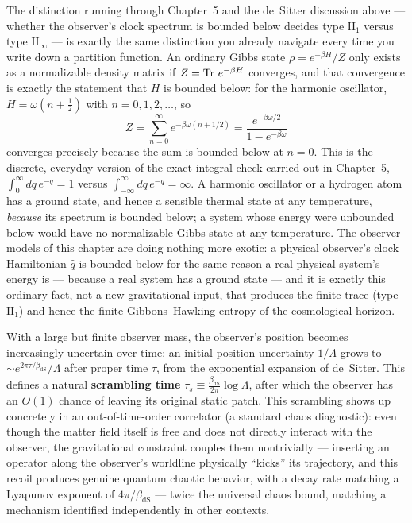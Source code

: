 \begin{physconnect}
The distinction running through Chapter~5 and the de~Sitter discussion above — whether the observer's clock
spectrum is bounded below decides type $\mathrm{II}_1$ versus type $\mathrm{II}_\infty$ — is exactly the same
distinction you already navigate every time you write down a partition function. An ordinary Gibbs state
$\rho=e^{-\beta H}/Z$ only exists as a normalizable density matrix if $Z=\operatorname{Tr}\,e^{-\beta H}$ converges, and
that convergence is exactly the statement that $H$ is bounded below: for the harmonic oscillator,
$H=\omega(n+\tfrac12)$ with $n=0,1,2,\dots$, so
\[
Z=\sum_{n=0}^\infty e^{-\beta\omega(n+1/2)}=\frac{e^{-\beta\omega/2}}{1-e^{-\beta\omega}}
\]
converges precisely because the sum is bounded below at $n=0$. This is the discrete, everyday version of the
exact integral check carried out in Chapter~5, $\int_0^\infty dq\,e^{-q}=1$ versus $\int_{-\infty}^\infty
dq\,e^{-q}=\infty$. A harmonic oscillator or a hydrogen atom has a ground state, and hence a sensible thermal
state at any temperature, \emph{because} its spectrum is bounded below; a system whose energy were unbounded
below would have no normalizable Gibbs state at any temperature. The observer models of this chapter are doing
nothing more exotic: a physical observer's clock Hamiltonian $\hat q$ is bounded below for the same reason a
real physical system's energy is — because a real system has a ground state — and it is exactly this ordinary
fact, not a new gravitational input, that produces the finite trace (type $\mathrm{II}_1$) and hence the
finite Gibbons--Hawking entropy of the cosmological horizon.
\end{physconnect}

With a large but finite observer mass, the observer's position becomes increasingly uncertain over time: an
initial position uncertainty $1/\Lambda$ grows to $\sim e^{2\pi\tau/\beta_{\text{dS}}}/\Lambda$ after proper
time $\tau$, from the exponential expansion of de~Sitter. This defines a natural \textbf{scrambling time}
$\tau_s\equiv\tfrac{\beta_{\text{dS}}}{2\pi}\log\Lambda$, after which the observer has an $O(1)$ chance of
leaving its original static patch. This scrambling shows up concretely in an out-of-time-order correlator (a
standard chaos diagnostic): even though the matter field itself is free and does not directly interact with
the observer, the gravitational constraint couples them nontrivially — inserting an operator along the
observer's worldline physically ``kicks'' its trajectory, and this recoil produces genuine quantum chaotic
behavior, with a decay rate matching a Lyapunov exponent of $4\pi/\beta_{\text{dS}}$ — twice the universal
chaos bound, matching a mechanism identified independently in other contexts.

